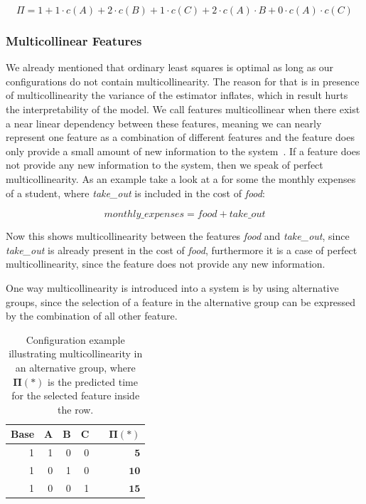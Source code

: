 \begin{equation}\label{equ:performanceExamplePIMBlackBox}
    \Pi = 1 + 1 \cdot c(A) + 2 \cdot c(B) + 1 \cdot c(C) + 2 \cdot c(A) \cdot B + 0 \cdot c(A) \cdot c(C)
\end{equation}

\subsubsection{Multicollinear Features}\label{ColinearF}
We already mentioned that ordinary least squares is optimal as long as our configurations do not contain multicollinearity. The reason for that
is in presence of multicollinearity the variance of the estimator inflates, which in result hurts the interpretability of the model.
We call features multicollinear when there exist a near linear dependency between these features, meaning we can nearly represent one feature as a combination
of different features and the feature does only provide a small amount of new information to the system~\cite{Linear-Regression}. If a feature does not provide
any new information to the system, then we speak of perfect multicollinearity. 
As an example take a look at a {\perfInfluenceModel} for some the monthly expenses of a student, where \textit{take\_out} is included in the 
cost of \textit{food}:

\begin{equation*}
    monthly\_expenses = \textit{food} + \textit{take\_out}
\end{equation*}

Now this shows multicollinearity between the features \textit{food} and \textit{take\_out}, since \textit{take\_out} is already present in the cost of \textit{food},
furthermore it is a case of perfect multicollinearity, since the feature does not provide any new information.

One way multicollinearity is introduced into a system is by using alternative groups, since the selection of a feature in the
alternative group can be expressed by the combination of all other feature.~\cite{Multicollinearity}

\begin{table}[H]
    \centering
    \begin{tabular}{rrrrrr}
    \toprule
    Base & A & B & C &  & $\bm{\Pi(*)}$ \\ \midrule
    1 & 1 & 0 & 0 &  & $\mathbf{5}$  \\
    1 & 0 & 1 & 0 &  & $\mathbf{10}$  \\  
    1 & 0 & 0 & 1 &  & $\mathbf{15}$  \\\bottomrule
    \end{tabular}  
    \caption{Configuration example illustrating multicollinearity in an alternative group,
    where $\bm{\Pi(*)}$ is the predicted time for the selected feature inside the row.}\label{tab:alternative}
\end{table}

